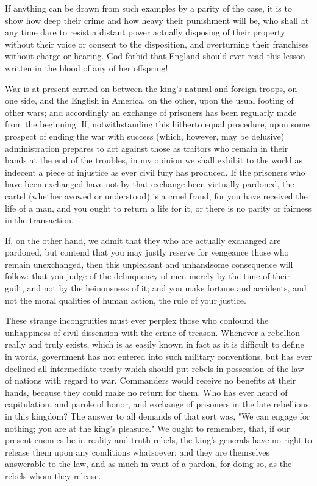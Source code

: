 If anything can be drawn from such examples by a parity of the case, it is to show how deep their crime and how heavy their punishment will be, who shall at any time dare to resist a distant power actually disposing of their property without their voice or consent to the disposition, and overturning their franchises without charge or hearing. God forbid that England should ever read this lesson written in the blood of any of her offspring!

War is at present carried on between the king's natural and foreign troops, on one side, and the English in America, on the other, upon the usual footing of other wars; and accordingly an exchange of prisoners has been regularly made from the beginning. If, notwithstanding this hitherto equal procedure, upon some prospect of ending the war with success (which, however, may be delusive) administration prepares to act against those as traitors who remain in their hands at the end of the troubles, in my opinion we shall exhibit to the world as indecent a piece of injustice as ever civil fury has produced. If the prisoners who have been exchanged have not by that exchange been virtually pardoned, the cartel (whether avowed or understood) is a cruel fraud; for you have received the life of a man, and you ought to return a life for it, or there is no parity or fairness in the transaction.

If, on the other hand, we admit that they who are actually exchanged are pardoned, but contend that you may justly reserve for vengeance those who remain unexchanged, then this unpleasant and unhandsome consequence will follow: that you judge of the delinquency of men merely by the time of their guilt, and not by the heinousness of it; and you make fortune and accidents, and not the moral qualities of human action, the rule of your justice.

These strange incongruities must ever perplex those who confound the unhappiness of civil dissension with the crime of treason. Whenever a rebellion really and truly exists, which is as easily known in fact as it is difficult to define in words, government has not entered into such military conventions, but has ever declined all intermediate treaty which should put rebels in possession of the law of nations with regard to war. Commanders would receive no benefits at their hands, because they could make no return for them. Who has ever heard of capitulation, and parole of honor, and exchange of prisoners in the late rebellions in this kingdom? The answer to all demands of that sort was, "We can engage for nothing; you are at the king's pleasure." We ought to remember, that, if our present enemies be in reality and truth rebels, the king's generals have no right to release them upon any conditions whatsoever; and they are themselves answerable to the law, and as much in want of a pardon, for doing so, as the rebels whom they release.

